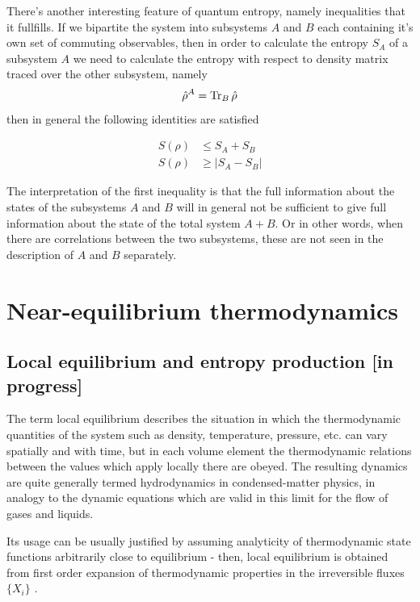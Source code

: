 \documentclass[a4paper,12pt]{article}
\begin{document}
There's another interesting feature of quantum entropy, namely inequalities that it fullfills.
If we bipartite the system into subsystems $A$ and $B$ each containing it's own set of commuting observables, then in order to calculate the entropy $S_A$ of a subsystem $A$ we need to calculate the entropy with respect to density matrix traced over the other subsystem, namely
\begin{equation}
  \hat{\rho}^A = \Tr_B \hat{\rho} 
\end{equation}
then in general the following identities are satisfied

\begin{equation}
\begin{aligned}
	S(\rho) &\leq S_A + S_B	\\
	S(\rho) &\geq \left| S_A - S_B \right|
\end{aligned}
\end{equation}

The interpretation of the first inequality is that the full information about the states of the subsystems $A$ and $B$ will in general not be sufficient to give full information about the state of the total system $A+B$. Or in other words, when there are correlations between the two subsystems, these are not seen in the description of $A$ and $B$ separately. 

\section{Near-equilibrium thermodynamics}
\subsection{Local equilibrium and entropy production [in progress]}

The term local equilibrium describes the situation in which the thermodynamic quantities of the system such as density, temperature, pressure, etc. can vary spatially and with time, but in each volume element the thermodynamic relations between the values which apply locally there are obeyed. The resulting dynamics are quite generally termed hydrodynamics in condensed-matter physics, in analogy to the dynamic equations which are valid in this limit for the flow of gases and liquids. 

Its usage can be usually justified by assuming analyticity of thermodynamic state functions arbitrarily close to equilibrium - then, local equilibrium is obtained from first order expansion of thermodynamic properties in the irreversible fluxes $\{X_i\}$ \cite{Evans:2002gg}.
\end{document}
